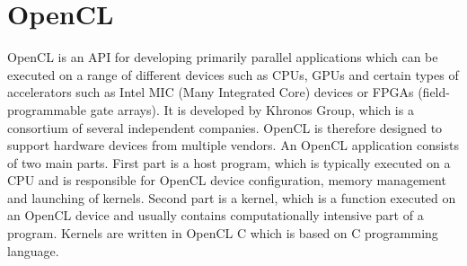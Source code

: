 \documentclass
[
    digital, %
    oneside, %
    table, %
    nolof, %
    nolot, %
    nocover %
]{fithesis3}
\begin{document}
\section{OpenCL}
OpenCL is an API for developing primarily parallel applications which can be executed on a range of different devices such as CPUs, GPUs and certain
types of accelerators such as Intel MIC (Many Integrated Core) devices or FPGAs (field-programmable gate arrays). It is developed by Khronos Group,
which is a consortium of several independent companies. OpenCL is therefore designed to support hardware devices from multiple vendors. An OpenCL
application consists of two main parts. First part is a host program, which is typically executed on a CPU and is responsible for OpenCL device
configuration, memory management and launching of kernels. Second part is a kernel, which is a function executed on an OpenCL device and usually contains
computationally intensive part of a program. Kernels are written in OpenCL C which is based on C programming language.
\end{document}
